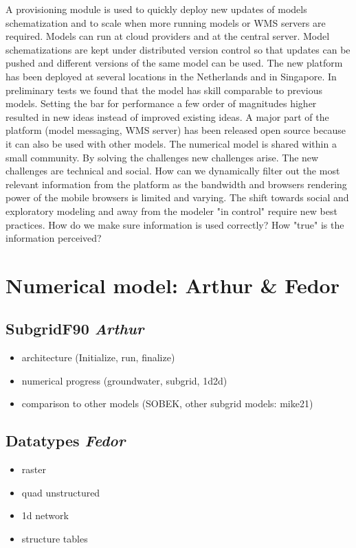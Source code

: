 \documentclass[a4paper]{article}
\begin{document}
A provisioning module is used to quickly deploy new updates of models schematization and to scale when more running models or WMS servers are required. Models can run at cloud providers and at the central server. Model schematizations are kept under distributed version control so that updates can be pushed and different versions of the same model can be used.
The new platform has been deployed at several locations in the Netherlands and in Singapore. In preliminary tests we found that the model has skill comparable to previous models. Setting the bar for performance a few order of magnitudes higher resulted in new ideas instead of improved existing ideas. A major part of the platform (model messaging, WMS server) has been released open source because it can also be used with other models. The numerical model is shared within a small community.
By solving the challenges new challenges arise. The new challenges are technical and social. How can we dynamically filter out the most relevant information from the platform as the bandwidth and browsers rendering power of the mobile browsers is limited and varying. The shift towards social and exploratory modeling and away from the modeler "in control" require new best practices. How do we make sure information is used correctly? How "true" is the information perceived?

\section{Numerical model: Arthur \& Fedor}
\subsection{SubgridF90 \emph{Arthur}}
\begin{itemize}
  \item architecture (Initialize, run, finalize)
  \item numerical progress (groundwater, subgrid, 1d2d)
  \item comparison to other models (SOBEK, other subgrid models: mike21)
\end{itemize}


\subsection{Datatypes \emph{Fedor}}
\begin{itemize}
  \item raster
  \item quad unstructured
  \item 1d network
  \item structure tables
\end{itemize}
\end{document}
